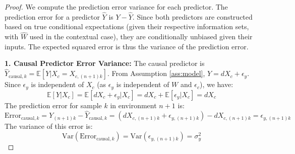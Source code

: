 \documentclass{article}
\theoremstyle{plain}
\theoremstyle{definition}
\theoremstyle{remark}
\newcommand{\E}{\mathbb{E}}
\newcommand{\Var}{\text{Var}}
\begin{document}
\begin{proof}
We compute the prediction error variance for each predictor. The prediction error for a predictor $\hat{Y}$ is $Y - \hat{Y}$. Since both predictors are constructed based on true conditional expectations (given their respective information sets, with $\hat{W}$ used in the contextual case), they are conditionally unbiased given their inputs. The expected squared error is thus the variance of the prediction error.

\textbf{1. Causal Predictor Error Variance:}
The causal predictor is $\hat{Y}_{\text{causal}, k} = \E[Y | X_c = X_{c,(n+1)k}]$.
From Assumption \ref{ass:model}, $Y = dX_c + \epsilon_y$. Since $\epsilon_y$ is independent of $X_c$ (as $\epsilon_y$ is independent of $W$ and $\epsilon_c$), we have:
\[
\E[Y | X_c] = \E[dX_c + \epsilon_y | X_c] = dX_c + \E[\epsilon_y | X_c] = dX_c
\]
The prediction error for sample $k$ in environment $n+1$ is:
\[
\text{Error}_{\text{causal}, k} = Y_{(n+1)k} - \hat{Y}_{\text{causal}, k} = (dX_{c,(n+1)k} + \epsilon_{y,(n+1)k}) - dX_{c,(n+1)k} = \epsilon_{y,(n+1)k}
\]
The variance of this error is:
\begin{equation} \label{eq:var_causal}
\Var(\text{Error}_{\text{causal}, k}) = \Var(\epsilon_{y,(n+1)k}) = \sigma_y^2
\end{equation}


\end{proof}
\end{document}
